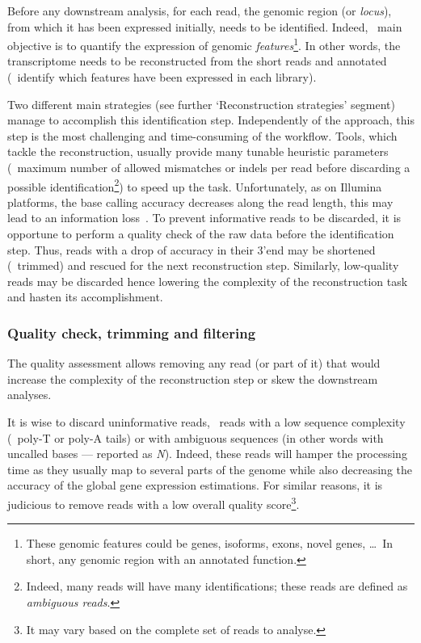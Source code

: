 Before any downstream analysis, for each read, the genomic region (or
\emph{locus}), from which it has been expressed initially, needs to be identified.
Indeed, \Rnaseq\ main objective is to quantify the expression of genomic
\emph{features}\footnote{These genomic features could be genes, isoforms,
exons, novel genes, \dots\
In short, any genomic region with an annotated function.}. In other words,
the transcriptome needs to be reconstructed from the short reads and annotated
(\ie\ identify which features have been expressed in each library).\mybr\

Two different main strategies (see further `Reconstruction strategies' segment)
manage to accomplish this identification step. Independently of the
approach, this step is the most challenging and time-consuming
of the workflow. Tools, which tackle the reconstruction, usually provide
many tunable heuristic parameters (\eg\ maximum number of allowed mismatches
or indels per read before discarding a possible identification\footnote{Indeed,
many reads will have many identifications; these reads are defined as
\emph{ambiguous reads}.})
to speed up the task.
Unfortunately, as on Illumina platforms, the base calling accuracy decreases
along the read length, this may lead to an information loss~.
To prevent informative reads to be discarded, it is opportune to perform a quality
check of the raw data before the identification step. Thus, reads with a drop of
accuracy in their 3'end may be shortened (\ie\ trimmed) and rescued for the next
reconstruction step. Similarly, low-quality reads may be discarded hence
lowering the complexity
of the reconstruction task and hasten its accomplishment.\mybr\

\subsubsection{Quality check, trimming and filtering}\label{subsub:trim}

The quality assessment allows removing any read (or part of it) that would
increase the complexity of the reconstruction step or skew the downstream analyses.\mybr\

It is wise to discard uninformative reads, \ie\ reads with a low sequence
complexity (\eg\ poly-T or poly-A tails) or with ambiguous sequences (in other
words with uncalled bases --- reported as \emph{N}).
Indeed, these reads will hamper the processing time as they
usually map to several parts of the genome while also decreasing the accuracy of
the global gene expression estimations.
For similar reasons, it is judicious to remove reads with a low overall quality
score\footnote{It may vary based on the complete set of reads to analyse.}.\mybr\

